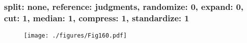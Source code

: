 \documentclass{beamer}
\begin{document}
\begin{frame}\frametitle{\small split: none, reference: judgments, randomize: 0, expand: 0, cut: 1, median: 1, compress: 1, standardize: 1}
\begin{center}
\begin{figure}
\centering
\texttt{[image: ./figures/Fig160.pdf]}
\label{spnoRejuRa0Ex0Cu1Me1Co1St1}
\end{figure}
\end{center}
\end{frame}
\end{document}
